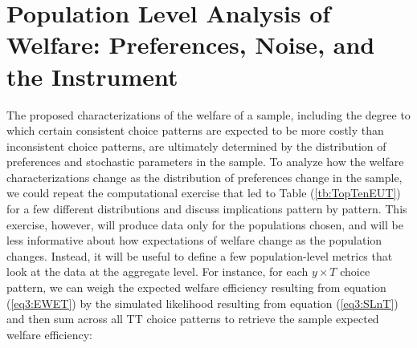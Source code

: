 \documentclass[../main.tex]{subfiles}
\begin{document}
%

\section{Population Level Analysis of Welfare: Preferences, Noise, and the Instrument}

The proposed characterizations of the welfare of a sample, including the degree to which certain consistent choice patterns are expected to be more costly than inconsistent choice patterns, are ultimately determined by the distribution of preferences and stochastic parameters in the sample.
To analyze how the welfare characterizations change as the distribution of preferences change in the sample, we could repeat the computational exercise that led to Table (\ref{tb:TopTenEUT}) for a few different distributions and discuss implications pattern by pattern.
This exercise, however, will produce data only for the populations chosen, and will be less informative about how expectations of welfare change as the population changes.
Instead, it will be useful to define a few population-level metrics that look at the data at the aggregate level.
For instance, for each $y \times T$ choice pattern, we can weigh the expected welfare efficiency resulting from equation (\ref{eq3:EWET}) by the simulated likelihood resulting from equation (\ref{eq3:SLnT}) and then sum across all TT choice patterns to retrieve the sample expected welfare efficiency:
\end{document}
